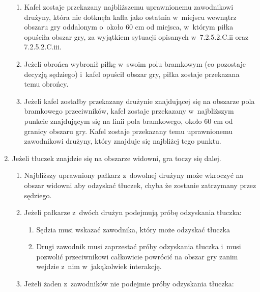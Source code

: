 \documentclass[12pt,a4paper]{article}
\begin{document}
\begin{enumerate}
	      \begin{enumerate}
		      \item
		            Kafel zostaje przekazany najbliższemu uprawnionemu zawodnikowi
		            drużyny, która nie dotknęła kafla jako ostatnia w~miejscu wewnątrz
		            obszaru gry oddalonym o~około 60 cm od miejsca, w~którym piłka
		            opuściła obszar gry, za wyjątkiem sytuacji opisanych w~7.2.5.2.C.ii
		            oraz 7.2.5.2.C.iii.
		      \item
		            Jeżeli obrońca wybronił piłkę w~swoim polu bramkowym (co pozostaje
		            decyzją sędziego) i~kafel opuścił obszar gry, piłka zostaje
		            przekazana temu obrońcy.
		      \item
		            Jeżeli kafel zostałby przekazany drużynie znajdującej się na
		            obszarze pola bramkowego przeciwników, kafel zostaje przekazany w~najbliższym punkcie znajdującym się na linii pola bramkowego, około
		            60 cm od granicy obszaru gry. Kafel zostaje przekazany temu
		            uprawnionemu zawodnikowi drużyny, który znajduje się najbliżej tego
		            punktu.
	      \end{enumerate}
	\item
	      Jeżeli tłuczek znajdzie się na obszarze widowni, gra toczy się dalej.

	      \begin{enumerate}
		      \item
		            Najbliższy uprawniony pałkarz z~dowolnej drużyny może wkroczyć na
		            obszar widowni aby odzyskać tłuczek, chyba że zostanie zatrzymany
		            przez sędziego.
		      \item
		            Jeżeli pałkarze z~dwóch drużyn podejmują próbę odzyskania tłuczka:

		            \begin{enumerate}
			            \item
			                  Sędzia musi wskazać zawodnika, który może odzyskać tłuczka
			            \item
			                  Drugi zawodnik musi zaprzestać próby odzyskania tłuczka i~musi
			                  pozwolić przeciwnikowi całkowicie powrócić na obszar gry zanim
			                  wejdzie z~nim w~jakąkolwiek interakcję.
		            \end{enumerate}
		      \item
		            Jeżeli żaden z~zawodników nie podejmie próby odzyskania tłuczka:


\end{enumerate}
\end{enumerate}
\end{document}
